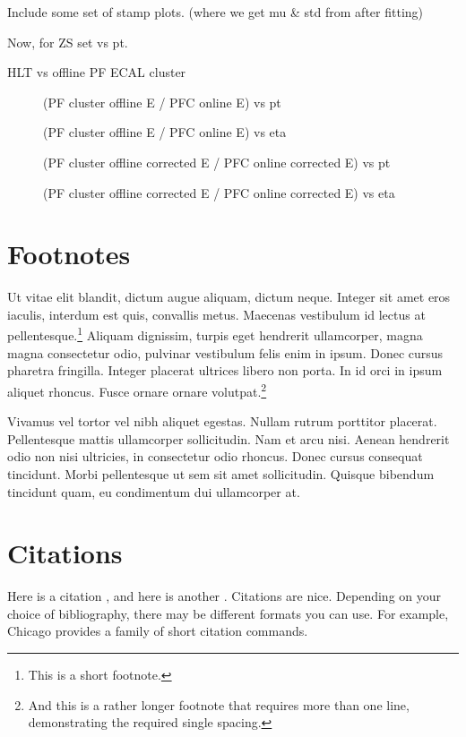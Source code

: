 Include some set of stamp plots. (where we get mu \& std from after fitting)

Now, for ZS set vs pt.


HLT vs offline PF ECAL cluster

\begin{figure}
\caption{(PF cluster offline E / PFC online E) vs pt}
\end{figure}
\begin{figure}
\caption{(PF cluster offline E / PFC online E) vs eta}
\end{figure}


\begin{figure}
\caption{(PF cluster offline corrected E / PFC online corrected E) vs pt}
\end{figure}
\begin{figure}
\caption{(PF cluster offline corrected E / PFC online corrected E) vs eta}
\end{figure}

\section{Footnotes}

Ut vitae elit blandit, dictum augue aliquam, dictum neque. Integer sit amet eros
iaculis, interdum est quis, convallis metus. Maecenas vestibulum id lectus at
pellentesque.\footnote{This is a short footnote.} Aliquam dignissim, turpis eget
hendrerit ullamcorper, magna magna consectetur odio, pulvinar vestibulum felis
enim in ipsum. Donec cursus pharetra fringilla. Integer placerat ultrices libero
non porta. In id orci in ipsum aliquet rhoncus. Fusce ornare ornare
volutpat.\footnote{And this is a rather longer footnote that requires more than
one line, demonstrating the required single spacing.}

Vivamus vel tortor vel nibh aliquet egestas. Nullam rutrum porttitor placerat.
Pellentesque mattis ullamcorper sollicitudin. Nam et arcu nisi. Aenean hendrerit
odio non nisi ultricies, in consectetur odio rhoncus. Donec cursus consequat
tincidunt. Morbi pellentesque ut sem sit amet sollicitudin. Quisque bibendum
tincidunt quam, eu condimentum dui ullamcorper at.

\section{Citations}

Here is a citation \cite{fake1}, and here is another \cite{fake2}. Citations are
nice. Depending on your choice of bibliography, there may be different formats
you can use. For example, Chicago provides a family of short citation commands.
